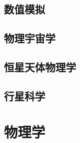 \documentclass[UTF8]{NatureUniverse}
\begin{document}
\section{数值模拟}
\section{物理宇宙学}
\section{恒星天体物理学}
\section{行星科学}



\chapter{物理学}    %
\end{document}
